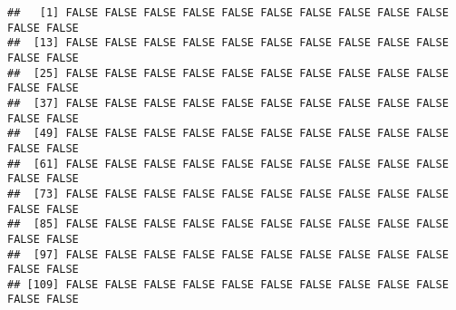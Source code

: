 \documentclass[
]{article}
\newenvironment{Shaded}{\begin{snugshade}}{\end{snugshade}}
\newcommand{\AttributeTok}[1]{\textcolor[rgb]{0.13,0.29,0.53}{#1}}
\newcommand{\CommentTok}[1]{\textcolor[rgb]{0.56,0.35,0.01}{\textit{#1}}}
\newcommand{\ConstantTok}[1]{\textcolor[rgb]{0.56,0.35,0.01}{#1}}
\newcommand{\FunctionTok}[1]{\textcolor[rgb]{0.13,0.29,0.53}{\textbf{#1}}}
\newcommand{\NormalTok}[1]{#1}
\newcommand{\OtherTok}[1]{\textcolor[rgb]{0.56,0.35,0.01}{#1}}
\newcommand{\SpecialCharTok}[1]{\textcolor[rgb]{0.81,0.36,0.00}{\textbf{#1}}}
\newcommand{\StringTok}[1]{\textcolor[rgb]{0.31,0.60,0.02}{#1}}
\begin{document}
\begin{Shaded}
\end{Shaded}

\begin{verbatim}
##   [1] FALSE FALSE FALSE FALSE FALSE FALSE FALSE FALSE FALSE FALSE FALSE FALSE
##  [13] FALSE FALSE FALSE FALSE FALSE FALSE FALSE FALSE FALSE FALSE FALSE FALSE
##  [25] FALSE FALSE FALSE FALSE FALSE FALSE FALSE FALSE FALSE FALSE FALSE FALSE
##  [37] FALSE FALSE FALSE FALSE FALSE FALSE FALSE FALSE FALSE FALSE FALSE FALSE
##  [49] FALSE FALSE FALSE FALSE FALSE FALSE FALSE FALSE FALSE FALSE FALSE FALSE
##  [61] FALSE FALSE FALSE FALSE FALSE FALSE FALSE FALSE FALSE FALSE FALSE FALSE
##  [73] FALSE FALSE FALSE FALSE FALSE FALSE FALSE FALSE FALSE FALSE FALSE FALSE
##  [85] FALSE FALSE FALSE FALSE FALSE FALSE FALSE FALSE FALSE FALSE FALSE FALSE
##  [97] FALSE FALSE FALSE FALSE FALSE FALSE FALSE FALSE FALSE FALSE FALSE FALSE
## [109] FALSE FALSE FALSE FALSE FALSE FALSE FALSE FALSE FALSE FALSE FALSE FALSE
\end{verbatim}
\end{document}
